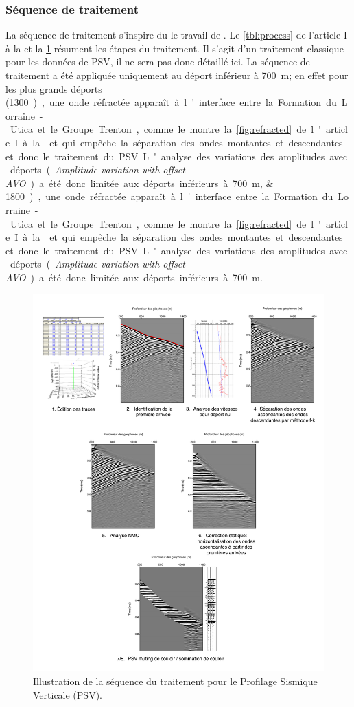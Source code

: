 \subsubsection{Séquence de traitement}
La séquence de traitement s'inspire du le travail de \citet{Coulombe1996,Zhang2010}. Le \cref{tbl:process} de l'article I à la  et la \cref{fig:traitement} résument les étapes du traitement. Il s'agit d'un traitement classique pour les données de PSV, il ne sera pas donc détaillé ici. La séquence de traitement a été appliquée uniquement au déport inférieur à \SI{700}{\metre}; en effet pour les plus grands déports (\SIlist{1300;1800} ), une onde réfractée apparaît à l'interface entre la Formation du Lorraine-Utica et le Groupe Trenton, comme le montre la \cref{fig:refracted} de l'article I à la  et qui empêche la séparation des ondes montantes et descendantes et donc le traitement du PSV. L'analyse des variations des amplitudes avec déports (\emph{Amplitude variation with offset - AVO}) a été donc limitée aux déports inférieurs à \SI{700}{\metre}.
\begin{figure}[!ht]
\centering
\includegraphics[width=1\textwidth]{fig/traitement.pdf}
\caption{Illustration de la séquence du traitement pour le Profilage Sismique Verticale (PSV).}
\label{fig:traitement}
\end{figure}
